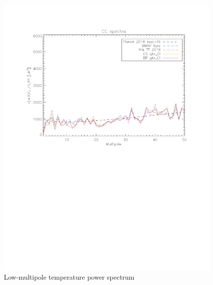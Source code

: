 \documentclass[twocolumn]{../../common/aa}
\begin{document}
\begin{figure}
	\includegraphics[width=\columnwidth]{figures/GaussCl_CG_lmax50.pdf}
	\caption{Low-multipole temperature power spectrum}
\end{figure}



%
%
%
%
\end{document}
